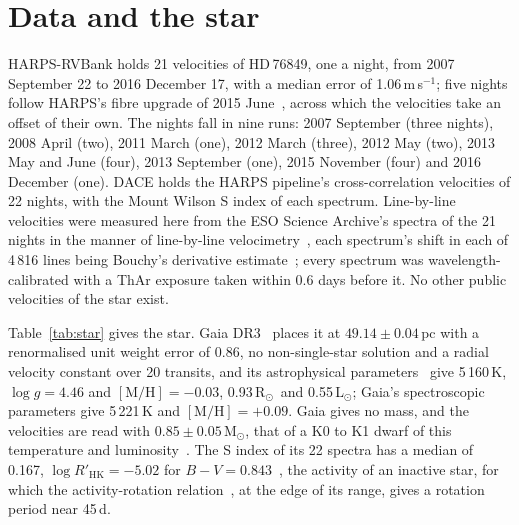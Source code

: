 \documentclass[3p,11pt]{elsarticle}
\newcommand{\ms}{m\,s$^{-1}$}
\newcommand{\Msun}{M$_\odot$}
\newcommand{\Rsun}{R$_\odot$}
\newcommand{\Lsun}{L$_\odot$}
\begin{document}
\section{Data and the star}\label{sec:data}

HARPS-RVBank holds 21 velocities of HD\,76849, one a night, from 2007 September 22 to 2016 December 17,
with a median error of 1.06\,\ms; five nights follow HARPS's fibre upgrade of 2015
June~\cite{LoCurto2015}, across which the velocities take an offset of their own. The nights fall in
nine runs: 2007 September (three nights), 2008 April (two), 2011 March (one), 2012 March (three), 2012
May (two), 2013 May and June (four), 2013 September (one), 2015 November (four) and 2016 December
(one). DACE holds the HARPS pipeline's cross-correlation velocities of 22 nights, with the Mount Wilson
S index of each spectrum. Line-by-line velocities were measured here from the ESO Science Archive's
spectra of the 21 nights in the manner of line-by-line velocimetry~\cite{Artigau2022}, each spectrum's
shift in each of 4\,816 lines being Bouchy's derivative estimate~\cite{Bouchy2001}; every spectrum was
wavelength-calibrated with a ThAr exposure taken within 0.6 days before it. No other public velocities
of the star exist.

Table~\ref{tab:star} gives the star. Gaia DR3~\cite{GaiaDR3} places it at $49.14 \pm 0.04$\,pc with a
renormalised unit weight error of 0.86, no non-single-star solution and a radial velocity constant over
20 transits, and its astrophysical parameters~\cite{Creevey2023} give 5\,160\,K, $\log g = 4.46$ and
$[\mathrm{M/H}] = -0.03$, 0.93\,\Rsun\ and 0.55\,\Lsun; Gaia's spectroscopic parameters give 5\,221\,K
and $[\mathrm{M/H}] = +0.09$. Gaia gives no mass, and the velocities are read with
$0.85 \pm 0.05$\,\Msun, that of a K0 to K1 dwarf of this temperature and
luminosity~\cite{Pecaut2013}. The S index of its 22 spectra has a median of 0.167,
$\log R'_\mathrm{HK} = -5.02$ for $B-V = 0.843$~\cite{Noyes1984}, the activity of an inactive star,
for which the activity-rotation relation~\cite{Mamajek2008}, at the edge of its range, gives a rotation
period near 45\,d.
\end{document}
